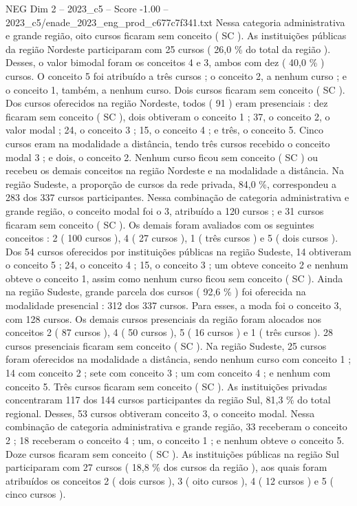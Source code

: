 \begin{textsample}{NEG Dim 2 – 2023\_c5 – Score -1.00 – 2023\_c5/enade\_2023\_eng\_prod\_c677c7f341.txt}
Nessa categoria administrativa e grande região, oito cursos ficaram sem conceito ( SC ).
As instituições públicas da região Nordeste participaram com 25 cursos ( 26,0 \% do total da região ).
Desses, o valor bimodal foram os conceitos 4 e 3, ambos com dez ( 40,0 \% ) cursos.
O conceito 5 foi atribuído a três cursos ; o conceito 2, a nenhum curso ; e o conceito 1, também, a nenhum curso.
Dois cursos ficaram sem conceito ( SC ).
Dos cursos oferecidos na região Nordeste, todos ( 91 ) eram presenciais : dez ficaram sem conceito ( SC ), dois obtiveram o conceito 1 ; 37, o conceito 2, o valor modal ; 24, o conceito 3 ; 15, o conceito 4 ; e três, o conceito 5.
Cinco cursos eram na modalidade a distância, tendo três cursos recebido o conceito modal 3 ; e dois, o conceito 2.
Nenhum curso ficou sem conceito ( SC ) ou recebeu os demais conceitos na região Nordeste e na modalidade a distância.
Na região Sudeste, a proporção de cursos da rede privada, 84,0 \%, correspondeu a 283 dos 337 cursos participantes.
Nessa combinação de categoria administrativa e grande região, o conceito modal foi o 3, atribuído a 120 cursos ; e 31 cursos ficaram sem conceito ( SC ).
Os demais foram avaliados com os seguintes conceitos : 2 ( 100 cursos ), 4 ( 27 cursos ), 1 ( três cursos ) e 5 ( dois cursos ).
Dos 54 cursos oferecidos por instituições públicas na região Sudeste, 14 obtiveram o conceito 5 ; 24, o conceito 4 ; 15, o conceito 3 ; um obteve conceito 2 e nenhum obteve o conceito 1, assim como nenhum curso ficou sem conceito ( SC ).
Ainda na região Sudeste, grande parcela dos cursos ( 92,6 \% ) foi oferecida na modalidade presencial : 312 dos 337 cursos.
Para esses, a moda foi o conceito 3, com 128 cursos.
Os demais cursos presenciais da região foram alocados nos conceitos 2 ( 87 cursos ), 4 ( 50 cursos ), 5 ( 16 cursos ) e 1 ( três cursos ). 28 cursos presenciais ficaram sem conceito ( SC ).
Na região Sudeste, 25 cursos foram oferecidos na modalidade a distância, sendo nenhum curso com conceito 1 ; 14 com conceito 2 ; sete com conceito 3 ; um com conceito 4 ; e nenhum com conceito 5.
Três cursos ficaram sem conceito ( SC ).
As instituições privadas concentraram 117 dos 144 cursos participantes da região Sul, 81,3 \% do total regional.
Desses, 53 cursos obtiveram conceito 3, o conceito modal.
Nessa combinação de categoria administrativa e grande região, 33 receberam o conceito 2 ; 18 receberam o conceito 4 ; um, o conceito 1 ; e nenhum obteve o conceito 5.
Doze cursos ficaram sem conceito ( SC ).
As instituições públicas na região Sul participaram com 27 cursos ( 18,8 \% dos cursos da região ), aos quais foram atribuídos os conceitos 2 ( dois cursos ), 3 ( oito cursos ), 4 ( 12 cursos ) e 5 ( cinco cursos ).

\end{textsample}
